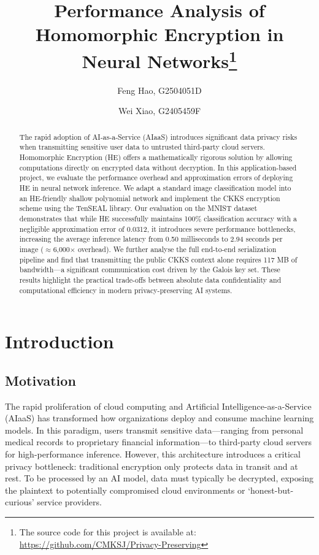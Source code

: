 \documentclass[runningheads]{llncs}
\begin{document}
%
\title{Performance Analysis of Homomorphic Encryption in Neural Networks\thanks{The source code for this project is available at: \protect\url{https://github.com/CMKSJ/Privacy-Preserving}}}

%
\author{Feng Hao, G2504051D \and Wei Xiao, G2405459F}
%
%
\institute{}
%
\maketitle              %
%
\begin{abstract}
The rapid adoption of AI-as-a-Service (AIaaS) introduces significant data privacy risks when transmitting sensitive user data to untrusted third-party cloud servers. Homomorphic Encryption (HE) offers a mathematically rigorous solution by allowing computations directly on encrypted data without decryption. In this application-based project, we evaluate the performance overhead and approximation errors of deploying HE in neural network inference. We adapt a standard image classification model into an HE-friendly shallow polynomial network and implement the CKKS encryption scheme using the TenSEAL library. Our evaluation on the MNIST dataset demonstrates that while HE successfully maintains 100\% classification accuracy with a negligible approximation error of 0.0312, it introduces severe performance bottlenecks, increasing the average inference latency from 0.50 milliseconds to 2.94 seconds per image ($\approx$6,000$\times$ overhead). We further analyse the full end-to-end serialization pipeline and find that transmitting the public CKKS context alone requires 117 MB of bandwidth---a significant communication cost driven by the Galois key set. These results highlight the practical trade-offs between absolute data confidentiality and computational efficiency in modern privacy-preserving AI systems.

\end{abstract}
%
%
%
\section{Introduction}

\subsection{Motivation}
The rapid proliferation of cloud computing and Artificial Intelligence-as-a-Service (AIaaS) has transformed how organizations deploy and consume machine learning models. In this paradigm, users transmit sensitive data---ranging from personal medical records to proprietary financial information---to third-party cloud servers for high-performance inference. However, this architecture introduces a critical privacy bottleneck: traditional encryption only protects data in transit and at rest. To be processed by an AI model, data must typically be decrypted, exposing the plaintext to potentially compromised cloud environments or `honest-but-curious' service providers.\cite{ref_course} 
\end{document}
